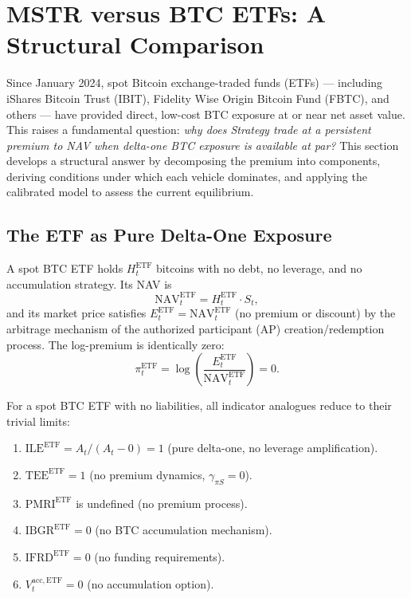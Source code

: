 \section{MSTR versus BTC ETFs: A Structural Comparison}
\label{sec:etf_comparison}

Since January 2024, spot Bitcoin exchange-traded funds (ETFs) --- including iShares Bitcoin Trust (IBIT), Fidelity Wise Origin Bitcoin Fund (FBTC), and others --- have provided direct, low-cost BTC exposure at or near net asset value. This raises a fundamental question: \emph{why does Strategy trade at a persistent premium to NAV when delta-one BTC exposure is available at par?} This section develops a structural answer by decomposing the premium into components, deriving conditions under which each vehicle dominates, and applying the calibrated model to assess the current equilibrium.

\subsection{The ETF as Pure Delta-One Exposure}
\label{subsec:etf_model}

\begin{definition}
\label{def:etf}
A spot BTC ETF holds $H_t^{\mathrm{ETF}}$ bitcoins with no debt, no leverage, and no accumulation strategy. Its NAV is
\begin{equation}
\label{eq:etf_nav}
  \mathrm{NAV}_t^{\mathrm{ETF}} = H_t^{\mathrm{ETF}} \cdot S_t,
\end{equation}
and its market price satisfies $E_t^{\mathrm{ETF}} = \mathrm{NAV}_t^{\mathrm{ETF}}$ (no premium or discount) by the arbitrage mechanism of the authorized participant (AP) creation/redemption process. The log-premium is identically zero:
\begin{equation}
\label{eq:etf_premium}
  \pi_t^{\mathrm{ETF}} = \log\!\left(\frac{E_t^{\mathrm{ETF}}}{\mathrm{NAV}_t^{\mathrm{ETF}}}\right) = 0.
\end{equation}
\end{definition}

\begin{proposition}
\label{prop:etf_greeks}
For a spot BTC ETF with no liabilities, all indicator analogues reduce to their trivial limits:
\begin{enumerate}
  \item $\mathrm{ILE}^{\mathrm{ETF}} = A_t / (A_t - 0) = 1$ (pure delta-one, no leverage amplification).
  \item $\mathrm{TEE}^{\mathrm{ETF}} = 1$ (no premium dynamics, $\gamma_{\pi S} = 0$).
  \item $\mathrm{PMRI}^{\mathrm{ETF}}$ is undefined (no premium process).
  \item $\mathrm{IBGR}^{\mathrm{ETF}} = 0$ (no BTC accumulation mechanism).
  \item $\mathrm{IFRD}^{\mathrm{ETF}} = 0$ (no funding requirements).
  \item $V_t^{\mathrm{acc,ETF}} = 0$ (no accumulation option).
\end{enumerate}
\end{proposition}

